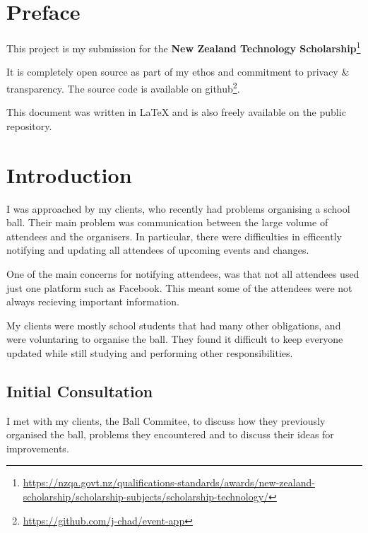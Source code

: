 \documentclass[a4paper,oneside,12pt,draft]{report}
\begin{document}
	\tableofcontents
	\pagebreak

	\chapter{Preface}
	This project is my submission for the \textbf{New Zealand Technology Scholarship}\footnote{\url{https://nzqa.govt.nz/qualifications-standards/awards/new-zealand-scholarship/scholarship-subjects/scholarship-technology/}}

	It is completely open source as part of my ethos and commitment to privacy \& transparency. The source code is available on github\footnote{\url{https://github.com/j-chad/event-app}}.

	This document was written in \LaTeX{} and is also freely available on the public repository.



	\chapter{Introduction}
	I was approached by my clients, who recently had problems organising a school ball. Their main problem was communication between the large volume of attendees and the organisers. In particular, there were difficulties in efficently notifying and updating all attendees of upcoming events and changes.

	One of the main concerns for notifying attendees, was that not all attendees used just one platform such as Facebook. This meant some of the attendees were not always recieving important information.

	My clients were mostly school students that had many other obligations, and were voluntaring to organise the ball. They found it difficult to keep everyone updated while still studying and performing other responsibilities.

	\section{Initial Consultation}
	I met with my clients, the Ball Commitee, to discuss how they previously organised the ball, problems they encountered and to discuss their ideas for improvements.
\end{document}
